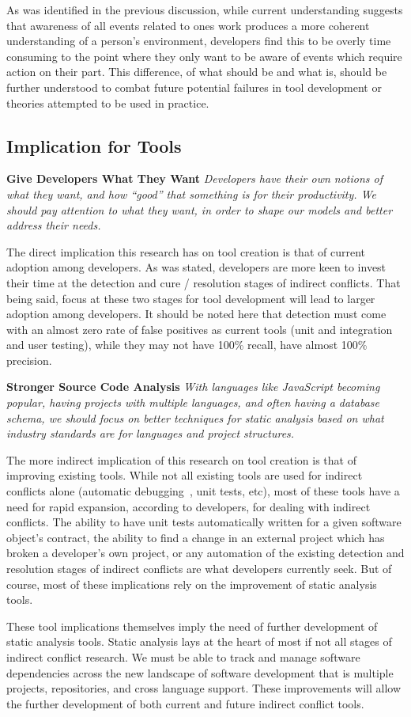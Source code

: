 As was identified in the previous discussion, while current understanding suggests that awareness of all events related to ones work
produces a more coherent understanding of a person's environment, developers find this to be overly time consuming
to the point where they only want to be aware of events which require action on their part. This difference, of what 
should be and what is, should be further understood to combat future potential failures in
tool development or theories attempted to be used in practice.

\subsection{Implication for Tools}
\label{sec:implt}

\textbf{Give Developers What They Want} \textit{Developers have their own notions of what they want, and how ``good''
that something is for their productivity. We should pay attention to what they want, in order to shape our
models and better address their needs.}

The direct implication this research has on tool creation is that of current adoption among developers. As was stated,
developers are more keen to invest their time at the detection and cure / resolution stages of indirect conflicts. That being 
said, focus at these two stages for tool development will lead to larger adoption among developers.
It should be noted here that detection must come with an almost zero rate of false positives as
current tools (unit and integration and user testing), while they may not have 100\% recall, have almost 100\% precision.

\textbf{Stronger Source Code Analysis} \textit{With languages like JavaScript becoming popular, having projects with
multiple languages, and often having a database schema, we should focus on better techniques for static analysis based
on what industry standards are for languages and project structures.}

The more indirect implication of this research on tool creation is that of improving existing tools. While not all existing
tools are used for indirect conflicts alone (automatic debugging~\cite{Zeller:2005:WPF}, unit tests, etc), most of these tools
have a need for rapid expansion, according to developers, for dealing with indirect conflicts. The ability to have unit tests
automatically written for a given software object's contract, the ability to find a change  in an external project
which has broken a developer's own project, or any automation of the existing detection and resolution stages of indirect
conflicts are what developers currently seek. But of course, most of these implications rely on the improvement of 
static analysis tools.

These tool implications themselves imply the need of further development of static analysis tools. Static 
analysis lays at the heart of most if not all stages of indirect conflict research. We must be able to track and manage
software dependencies across the new landscape of software development that is multiple projects, repositories, and cross
language support. These improvements will allow the further development of both current and future indirect conflict
tools.

